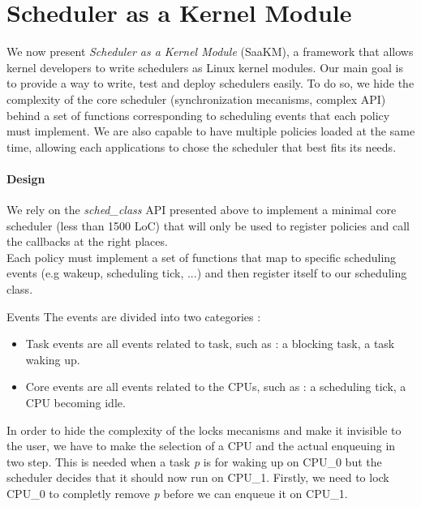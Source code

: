 \section{Scheduler as a Kernel Module}
\label{sec:scheduler-as-a-kernel-module}

\par We now present \textit{Scheduler as a Kernel Module} (SaaKM), a framework that allows kernel developers to write schedulers as Linux kernel modules. Our main goal is to provide a way to write, test and deploy schedulers easily. To do so, we hide the complexity of the core scheduler (synchronization mecanisms, complex API) behind a set of functions corresponding to scheduling events that each policy must implement. We are also capable to have multiple policies loaded at the same time, allowing each applications to chose the scheduler that best fits its needs.

\paragraph{Design}
\par We rely on the \textit{sched\_class} API presented above to implement a minimal core scheduler (less than 1500 LoC) that will only be used to register policies and call the callbacks at the right places. \\ Each policy must implement a set of functions that map to specific scheduling events (e.g wakeup, scheduling tick, ...) and then register itself to our scheduling class.
\par{Events} The events are divided into two categories :
\begin{itemize}
        \item{Task events} are all events related to task, such as : a blocking task, a task waking up.
        \item{Core events} are all events related to the CPUs, such as : a scheduling tick, a CPU becoming idle.
\end{itemize}

In order to hide the complexity of the locks mecanisms and make it invisible to the user, we have to make the selection of a CPU and the actual enqueuing in two step. This is needed when a task \textit{p} is for waking up on CPU_0 but the scheduler decides that it should now run on CPU_1. Firstly, we need to lock CPU_0 to completly remove \textit{p} before we can enqueue it on CPU_1. 